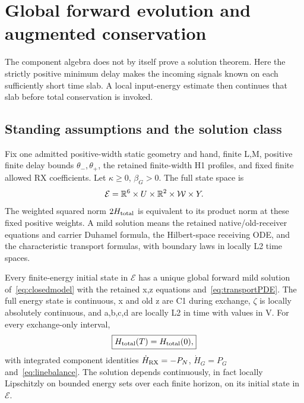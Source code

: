 \section{Global forward evolution and augmented conservation}\label{sec:evolution}
The component algebra does not by itself prove a solution theorem. Here the strictly positive minimum delay makes the incoming signals known on each sufficiently short time slab. A local input-energy estimate then continues that slab before total conservation is invoked.

\subsection{Standing assumptions and the solution class}
Fix one admitted positive-width static geometry and hand, finite L,M, positive finite delay bounds $\theta_-,\theta_+$, the retained finite-width H1 profiles, and fixed finite allowed RX coefficients. Let $\kappa\ge0$, $\beta_G>0$. The full state space is
\begin{equation}\label{eq:fullspace}
\mathcal E=\mathbb R^6\times U\times\mathbb R^2\times\mathcal W\times Y.
\end{equation}
The weighted squared norm $2H_{\rm total}$ is equivalent to its product norm at these fixed positive weights. A mild solution means the retained native/old-receiver equations and carrier Duhamel formula, the Hilbert-space receiving ODE, and the characteristic transport formulas, with boundary laws in locally L2 time spaces.

\begin{theorem}\label{thm:global}
Every finite-energy initial state in $\mathcal E$ has a unique global forward mild solution of~\eqref{eq:closedmodel} with the retained x,z equations and~\eqref{eq:transportPDE}. The full energy state is continuous, x and old z are C1 during exchange, $\zeta$ is locally absolutely continuous, and a,b,c,d are locally L2 in time with values in V. For every exchange-only interval,
\begin{equation}\label{eq:conservation}
\boxed{H_{\rm total}(T)=H_{\rm total}(0),}
\end{equation}
with integrated component identities $\dot H_{\rm RX}=-P_N$, $\dot H_G=P_G$ and~\eqref{eq:linebalance}. The solution depends continuously, in fact locally Lipschitzly on bounded energy sets over each finite horizon, on its initial state in $\mathcal E$.
\end{theorem}

